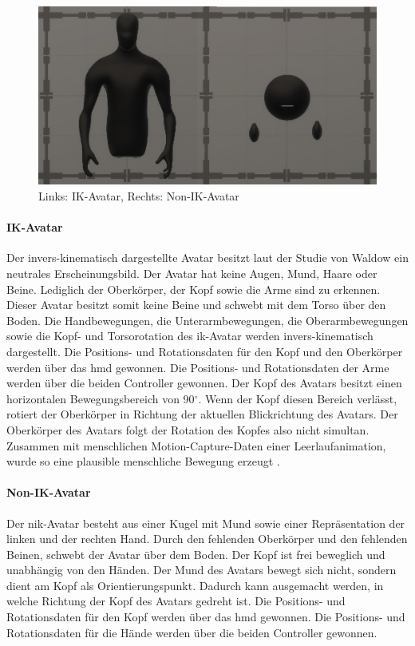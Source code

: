 \documentclass[a4paper,11pt]{article}%
\renewcommand{\\}{\vspace*{0.5\baselineskip} \newline}
\begin{document}
	\begin{figure}[H]
		\begin{footnotesize}
		\centering
			\includegraphics[width=\textwidth]{Abbildungen/Avatars.JPG}	
			\caption[Die verwendeten Avatare]{Links: IK-Avatar, Rechts: Non-IK-Avatar}
			\label{AvatareAussehen}
		\end{footnotesize}
	\end{figure}
		\paragraph{IK-Avatar}
Der invers-kinematisch dargestellte Avatar besitzt laut der Studie von Waldow \citep[S.251]{waldow2019investigating} ein neutrales Erscheinungsbild. Der Avatar hat keine Augen, Mund, Haare oder Beine. Lediglich der Oberkörper, der Kopf sowie die Arme sind zu erkennen. Dieser Avatar besitzt somit keine Beine und schwebt mit dem Torso über den Boden.
Die Handbewegungen, die Unterarmbewegungen, die Oberarmbewegungen sowie die Kopf- und Torsorotation des \ac{ik}-Avatar werden invers-kinematisch dargestellt. Die Positions- und Rotationsdaten für den Kopf und den Oberkörper werden über das \ac{hmd} gewonnen. Die Positions- und Rotationsdaten der Arme werden über die beiden Controller gewonnen. Der Kopf des Avatars besitzt einen horizontalen Bewegungsbereich von 90$^\circ$. Wenn der Kopf diesen Bereich verlässt, rotiert der Oberkörper in Richtung der aktuellen Blickrichtung des Avatars. Der Oberkörper des Avatars folgt der Rotation des Kopfes also nicht simultan. Zusammen mit menschlichen Motion-Capture-Daten einer Leerlaufanimation, wurde so eine plausible menschliche Bewegung erzeugt \citep[S.251]{waldow2019investigating}.

		\paragraph{Non-IK-Avatar}
Der \ac{nik}-Avatar besteht aus einer Kugel mit Mund sowie einer Repräsentation der linken und der rechten Hand. Durch den fehlenden Oberkörper und den fehlenden Beinen, schwebt der Avatar über dem Boden. Der Kopf ist frei beweglich und unabhängig von den Händen. Der Mund des Avatars bewegt sich nicht, sondern dient am Kopf als Orientierungspunkt. Dadurch kann ausgemacht werden, in welche Richtung der Kopf des Avatars gedreht ist. Die Positions- und Rotationsdaten für den Kopf werden über das \ac{hmd} gewonnen. Die Positions- und Rotationsdaten für die Hände werden über die beiden Controller gewonnen.
\newpage
\end{document}
